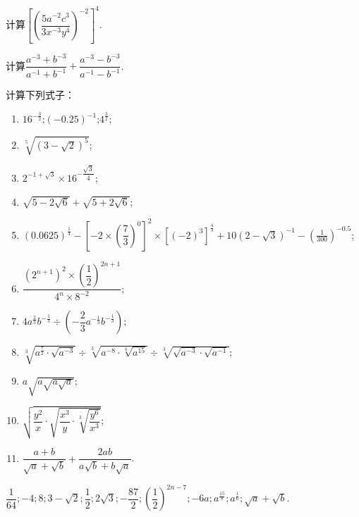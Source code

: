 \documentclass[lang=cn,newtx,10pt,scheme=chinese]{elegantbook}
\begin{document}
\begin{spacing}{1.8}
  \begin{exercise}\label{ZXSXSYJC_reformatted_3_P9.8b}
  计算$\left[\left(\dfrac{5a^{-2}c^3}{3x^{-3}y^4}\right)^{-2}\right]^4$.
  \end{exercise}

  \begin{exercise}\label{ZXSXSYJC_reformatted_3_P9.9b}
  计算$\dfrac{a^{-3}+b^{-3}}{a^{-1}+b^{-1}}+\dfrac{a^{-3}-b^{-3}}{a^{-1}-b^{-1}}$.
  \end{exercise}
\end{spacing}

\begin{exercise}
  计算下列式子：
\end{exercise}

\begin{spacing}{1.8}
  \begin{enumerate}
    \item $16^{-\frac{3}{2}}$;$\left(-0.25\right)^{-1}$;$4^{\frac32}$;
    \item $\sqrt[5]{(3-\sqrt{2})^5}$;
    \item $2^{-1+\sqrt{3}}\times16^{-\dfrac{\sqrt{3}}4}$;
    \item $\sqrt{5-2\sqrt6}+\sqrt{5+2\sqrt6}$;
    \item $(0.0625)^{\frac{1}{4}}-\left[-2\times\left(\dfrac{7}{3}\right)^{0}\right]^{2}\times\left[\left(-2\right)^{3}\right]^{\frac{4}{3}}+10\left(2-\sqrt{3}\right)^{-1}-\left(\frac{1}{300}\right)^{-0.5}$;
    \item $\dfrac{\left(2^{n+1}\right)^2\times\left(\dfrac{1}{2}\right)^{2n+1}}{4^n\times8^{-2}}$;
    \item $4a^{\frac{2}{3}}b^{-\frac{1}{3}}\div\left(-\dfrac{2}{3}a^{-\frac{1}{3}}b^{-\frac{1}{3}}\right)$;
    \item $\sqrt[3]{a^{\frac{7}{2}}\cdot\sqrt{a^{-3}}}\div\sqrt[3]{a^{-8}\cdot\sqrt[3]{a^{15}}}\div\sqrt[3]{\sqrt{a^{-3}}\cdot\sqrt{a^{-1}}}$;
    \item $a\sqrt{a\sqrt{a\sqrt{a}}}$;
    \item $\sqrt{\dfrac{y^{2}}{x}\cdot\sqrt{\dfrac{x^{3}}{y}\cdot\sqrt[3]{\dfrac{y^{6}}{x^{3}}}}}$;
    \item $\dfrac{a+b}{\sqrt{a}+\sqrt{b}}+\dfrac{2ab}{a\sqrt{b}+b\sqrt{a}}$.
  \end{enumerate}
\end{spacing}

\begin{solution}
  $\dfrac{1}{64};-4;8;3-\sqrt{2};\dfrac12;2\sqrt{3};-\dfrac{87}{2};\left(\dfrac12\right)^{2n-7};-6a;a^{\frac{15}{8}};a^{\frac16};\sqrt{a}+\sqrt{b}.$
\end{solution}
\end{document}
